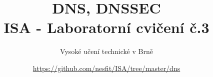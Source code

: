 \documentclass[a4paper,11pt]{article}
\title{DNS, DNSSEC\\
{\bf\large ISA - Laboratorní cvičení č.3}}
\author{Vysoké učení technické v Brně}
\date{\url{https://github.com/nesfit/ISA/tree/master/dns}}
\begin{document}
{\let\newpage\relax\maketitle}


\end{document}
